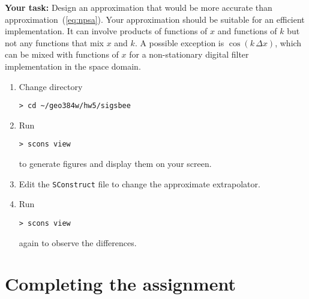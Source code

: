 \begin{enumerate}
  \textbf{Your task:} Design an approximation that would be more accurate
  than approximation~(\ref{eq:npsa}). Your approximation should be
  suitable for an efficient implementation. It can involve products of functions
  of $x$  and functions
  of $k$ but not any functions that mix $x$ and $k$. A possible exception is $\cos{(k\,\Delta x)}$, which can be mixed
  with functions of $x$ for a non-stationary digital filter implementation in the space domain.
    \begin{enumerate}
    \item Change directory 
\begin{verbatim}
> cd ~/geo384w/hw5/sigsbee
\end{verbatim}
    \item Run
\begin{verbatim}
> scons view
\end{verbatim}
      to generate figures and display them on your screen.  
    \item Edit the \texttt{SConstruct} file to change the approximate extrapolator.
    \item Run
\begin{verbatim}
> scons view
\end{verbatim}
      again to observe the differences.
    \end{enumerate}




{\small
  }

\end{enumerate}

\section{Completing the assignment}

